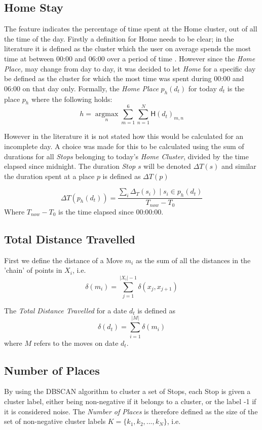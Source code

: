 \subsection{Home Stay}
The  feature indicates the percentage of time spent at the Home cluster, out of all the time of the day. Firstly a definition for Home needs to be clear; in the literature it is defined as the cluster which the user on average spends the most time at between 00:00 and 06:00 over a period of time \cite{Saeb2015, Canzian2015}. However since the \textit{Home Place,} may change from day to day, it was decided to let \textit{Home} for a specific day be defined as the cluster for which the most time was spent during 00:00 and 06:00 on that day only. Formally, the \textit{Home Place} $p_h (d_t)$ for today $d_t$ is the place $p_h$ where the following holds:
$$h = \operatorname*{argmax}_n \sum_{m=1}^{6} \sum_{n=1}^{N}  \mathsf{H}(d_t)_{m,n}$$

However in the literature \cite{Saeb2015, Canzian2015} it is not stated how this would be calculated for an incomplete day. A choice was made for this to be calculated using the sum of durations for all \textit{Stops} belonging to today's \textit{Home Cluster}, divided by the time elapsed since midnight. The duration \textit{Stop} $s$ will be denoted $\Delta T (s)$ and similar the duration spent at a place $p$ is defined as $\Delta T (p)$

$$\Delta T(p_{h} (d_t) )= \frac{\sum_i \Delta_T (s_i) \;|\; s_i \in p_h (d_t)}{T_{now} - T_{0}}$$
Where $T_{now} - T_0$ is the time elapsed since 00:00:00.

\subsection{Total Distance Travelled}
First we define the distance of a Move $m_i$ as the sum of all the distances in the 'chain' of points in $X_i$, i.e.
$$\delta (m_i)  = \sum_{j=1}^{|X_i|-1} \delta (x_j, x_{j+1})$$

The \textit{Total Distance Travelled} for a date $d_t$ is defined as $$\delta (d_t) = \sum_{i=1}^{|M|} \delta (m_i) $$ where $M$ refers to the moves on date $d_t$.

\subsection{Number of Places}
By using the DBSCAN algorithm to cluster a set of Stops, each Stop is given a cluster label, either being non-negative if it belongs to a cluster, or the label -1 if it is considered noise. The \textit{Number of Places} is therefore defined as the size of the set of non-negative cluster labels $K = \{k_1, k_2, ..., k_N\}$, i.e.

